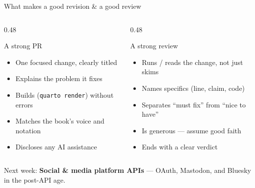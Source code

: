 \documentclass[9pt,aspectratio=169]{beamer}
\begin{document}
\begin{frame}{What makes a good revision \& a good review}
    \begin{columns}[T]
        \begin{column}{0.48\textwidth}
            \begin{block}{A strong PR}
                \begin{itemize}\small
                    \item One focused change, clearly titled
                    \item Explains the problem it fixes
                    \item Builds (\texttt{quarto render}) without errors
                    \item Matches the book's voice and notation
                    \item Discloses any AI assistance
                \end{itemize}
            \end{block}
        \end{column}
        \begin{column}{0.48\textwidth}
            \begin{block}{A strong review}
                \begin{itemize}\small
                    \item Runs / reads the change, not just skims
                    \item Names specifics (line, claim, code)
                    \item Separates ``must fix'' from ``nice to have''
                    \item Is generous --- assume good faith
                    \item Ends with a clear verdict
                \end{itemize}
            \end{block}
        \end{column}
    \end{columns}
    \vspace{0.5em}
    \centering\small Next week: \textbf{Social \& media platform APIs} --- OAuth, Mastodon, and Bluesky in the post-API age.
\end{frame}
\end{document}
